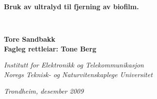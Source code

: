 \thispagestyle{empty}
\begin{center}
 
  \vspace{25mm}
  
  \LARGE
  \textbf{Bruk av ultralyd til fjerning av biofilm.} \\
  
  \vspace{5mm}
  
  \textbf{} \\
  \vspace{5mm}
  
  \normalsize
  \textbf{Tore Sandbakk} \\
  \textbf{Fagleg rettleiar: Tone Berg}\\
  
  \vspace{30mm}
  
  \Large
  
  \vspace{20mm}
  
  \textsl{Institutt for Elektronikk og Telekommunikasjon} \\
  \textsl{Noregs Teknisk- og Naturvitenskaplege Universitet} \\
  
  \vspace{10mm}
  
  \large
  \textsl{Trondheim, desember 2009} \\
\end{center}